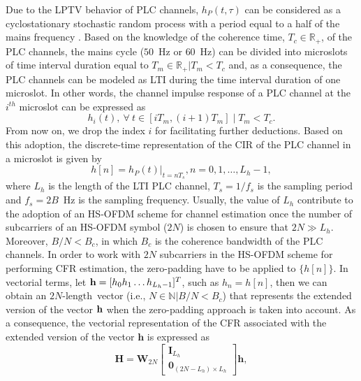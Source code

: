 \documentclass[journal]{IEEEtran}
\begin{document}
Due to the \ac{LPTV} behavior of \ac{PLC} channels, $h_P(t,\tau)$ can be considered as a cyclostationary stochastic random process with a period equal to a half of the mains frequency \cite{Colen:TCRA}. Based on the knowledge of the coherence time, $T_c \in \mathbb{R}_+$, of the \ac{PLC} channels, the mains cycle ($50$~Hz or $60$~Hz) can be divided into microslots of time interval duration equal to $T_m\in \mathbb{R}_+|T_m < T_c$ and, as a consequence, the \ac{PLC} channels can be modeled as \ac{LTI} during the time interval duration of one microslot. In other words, the channel impulse response of a \ac{PLC} channel at the $i^{th}$ microslot can be expressed as
\begin{equation} \label{discreteh}
h_{i}(t),~\forall~t \in [iT_{m}, (i+1)T_{m}] \mid T_{m} < T_{c}.
\end{equation}
From now on, we drop the index $i$ for facilitating further deductions. Based on this adoption, the discrete-time representation of the \ac{CIR} of the \ac{PLC} channel in a microslot is given by
\begin{equation} \label{discreteCFR}
h[n] = h_P(t)|_{t=nT_s} , n = 0,1, \ldots, L_h-1, 
\end{equation}
where $L_{h}$ is the length of the \ac{LTI} \ac{PLC} channel, $T_s=1/f_s$ is the sampling period and $f_s=2B$~Hz is the sampling frequency. Usually, the value of $L_{h}$ contribute to the adoption of an \ac{HS-OFDM} scheme for channel estimation once the number of subcarriers of an \ac{HS-OFDM} symbol ($2N$) is chosen to ensure that $2N \gg L_h$. Moreover, $B/N < B_c$, in which $B_c$ is the coherence bandwidth of the \ac{PLC} channels. In order to work with $2N$ subcarriers in the \ac{HS-OFDM} scheme for performing \ac{CFR} estimation, the zero-padding have to be applied to $\{h[n]\}$. In vectorial terms, let ${\bf h}=[h_0 h_1 \ldots h_{L_h-1}]^T$, such as $h_n=h[n]$, then we can obtain an $2N\text{-length}$~vector (i.e., $N\in \mathbb{N}|B/N<B_c$) that represents the extended version of the vector ${\bf h}$ when the zero-padding approach is taken into account. As a consequence, the vectorial representation of the \ac{CFR} associated with the extended version of the vector $\mathbf{h}$ is expressed as
\begin{equation}
\mathbf{H} = \mathbf{W}_{2N}  \begin{bmatrix} \mathbf{I}_{L_h} \\ \mathbf{0}_{(2N-L_{h})\times L_{h}} \end{bmatrix} \mathbf{h},
\end{equation}
\end{document}
